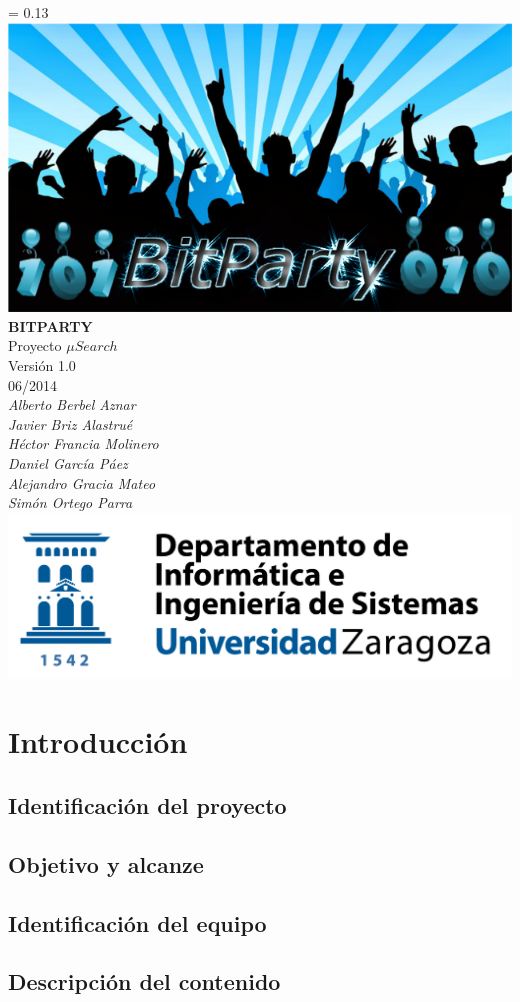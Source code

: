 \documentclass[10pt,spanish]{article}
\let\stdsection\section
\renewcommand\section{\newpage\stdsection}
\newcommand{\nombreDelProyecto}{$\mu Search$}
\newcommand{\singlelinebreak}{\\[\baselineskip]}
\newcommand{\multiplelinebreak}[1]{\\[#1\baselineskip]}
\newlength{\drop}
\newcommand*{\titulo}{\begingroup
\thispagestyle{empty}
\drop = 0.13\textheight
\centering
\vfill
\vspace*{\drop}
\includegraphics[scale=0.25]{img/bitparty_big}\singlelinebreak
{\Huge\bf BITPARTY}\multiplelinebreak{2}
{\huge Proyecto \nombreDelProyecto}\multiplelinebreak{2}
{\Large Versión  1.0}\multiplelinebreak{1}
{\Large 06/2014}\multiplelinebreak{1}
{\em Alberto Berbel Aznar}\\
{\em Javier Briz Alastrué}\\
{\em Héctor Francia Molinero}\\
{\em Daniel García Páez}\\
{\em Alejandro Gracia Mateo}\\
{\em Simón Ortego Parra}\multiplelinebreak{6}
\includegraphics[scale=0.09]{img/diis_uz_big}\singlelinebreak
\vfill
\vspace*{\drop}
\endgroup}
\renewcommand{\thepage}{}
\begin{document}
\titulo
\clearpage

\pagestyle{fancy}
\tableofcontents


\renewcommand{\thepage}{\arabic{page}}

\section{Introducción}


\subsection{Identificación del proyecto}


\subsection{Objetivo y alcanze}


\subsection{Identificación del equipo}


\subsection{Descripción del contenido}


\end{document}

